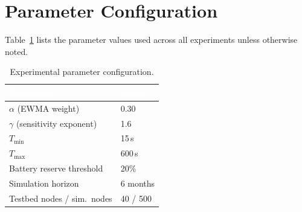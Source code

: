 \section{Parameter Configuration}
Table~\ref{tab:params} lists the parameter values used across all experiments unless
otherwise noted.

\begin{table}[H]
\centering
\caption{Experimental parameter configuration.}
\label{tab:params}
\begin{tabularx}{\textwidth}{@{}lX@{}}
\toprule
\rowcolor{nustgreen}
\textcolor{white}{\bfseries Parameter} & \textcolor{white}{\bfseries Value} \\
\midrule
$\alpha$ (EWMA weight)     & 0.30 \\
\rowcolor{nustmist}
$\gamma$ (sensitivity exponent) & 1.6 \\
$T_{\min}$                 & 15\,s \\
\rowcolor{nustmist}
$T_{\max}$                 & 600\,s \\
Battery reserve threshold  & 20\% \\
\rowcolor{nustmist}
Simulation horizon          & 6 months \\
Testbed nodes / sim.\ nodes & 40 / 500 \\
\bottomrule
\end{tabularx}
\end{table}


